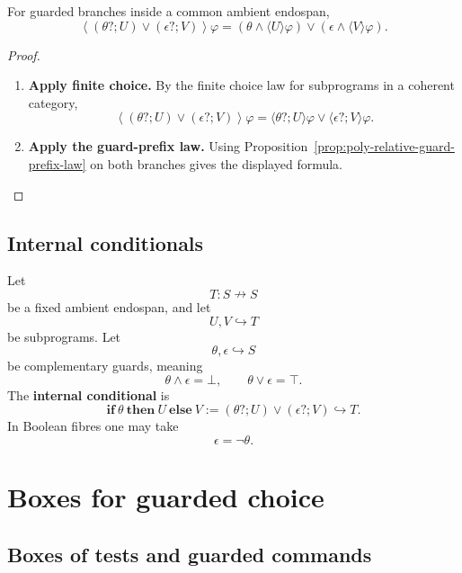 \begin{proposition}
\label{prop:poly-relative-guarded-choice-diamond}
For guarded branches inside a common ambient endospan,
\[
\left\langle
(\theta?;U)\vee(\epsilon?;V)
\right\rangle\varphi
=
(\theta\wedge\langle U\rangle\varphi)
\vee
(\epsilon\wedge\langle V\rangle\varphi).
\]
\end{proposition}

\begin{proof}
\leavevmode
\begin{enumerate}
\item \textbf{Apply finite choice.}
By the finite choice law for subprograms in a coherent category,
\[
\left\langle
(\theta?;U)\vee(\epsilon?;V)
\right\rangle\varphi
=
\langle\theta?;U\rangle\varphi
\vee
\langle\epsilon?;V\rangle\varphi.
\]

\item \textbf{Apply the guard-prefix law.}
Using Proposition~\ref{prop:poly-relative-guard-prefix-law} on both branches
gives the displayed formula.
\end{enumerate}
\end{proof}

\subsection{Internal conditionals}
\label{subsec:poly-relative-conditionals}

\begin{definition}
\label{def:poly-relative-conditional}
Let
\[
T:S\nrightarrow S
\]
be a fixed ambient endospan, and let
\[
U,V\hookrightarrow T
\]
be subprograms.  Let
\[
\theta,\epsilon\hookrightarrow S
\]
be complementary guards, meaning
\[
\theta\wedge\epsilon=\bot,
\qquad
\theta\vee\epsilon=\top.
\]
The \textbf{internal conditional} is
\[
\mathbf{if}\ \theta\ \mathbf{then}\ U\ \mathbf{else}\ V
:=
(\theta?;U)\vee(\epsilon?;V)
\hookrightarrow T.
\]
In Boolean fibres one may take
\[
\epsilon=\neg\theta.
\]
\end{definition}

\section{Boxes for guarded choice}
\label{sec:poly-relative-boxes-choice}

\subsection{Boxes of tests and guarded commands}
\label{subsec:poly-relative-boxes-tests-guarded}

